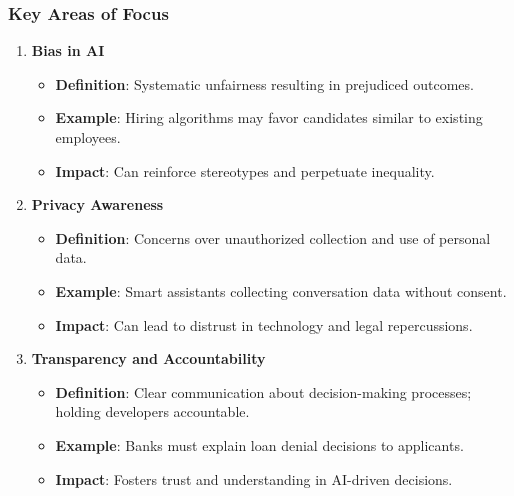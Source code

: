 \documentclass[aspectratio=169]{beamer}
\begin{document}
\begin{frame}[fragile]
    \frametitle{Key Areas of Focus}
    \begin{enumerate}
        \item \textbf{Bias in AI}
            \begin{itemize}
                \item \textbf{Definition}: Systematic unfairness resulting in prejudiced outcomes.
                \item \textbf{Example}: Hiring algorithms may favor candidates similar to existing employees.
                \item \textbf{Impact}: Can reinforce stereotypes and perpetuate inequality.
            \end{itemize}
        
        \item \textbf{Privacy Awareness}
            \begin{itemize}
                \item \textbf{Definition}: Concerns over unauthorized collection and use of personal data.
                \item \textbf{Example}: Smart assistants collecting conversation data without consent.
                \item \textbf{Impact}: Can lead to distrust in technology and legal repercussions.
            \end{itemize}

        \item \textbf{Transparency and Accountability}
            \begin{itemize}
                \item \textbf{Definition}: Clear communication about decision-making processes; holding developers accountable.
                \item \textbf{Example}: Banks must explain loan denial decisions to applicants.
                \item \textbf{Impact}: Fosters trust and understanding in AI-driven decisions.
            \end{itemize}
    \end{enumerate}
\end{frame}
\end{document}
